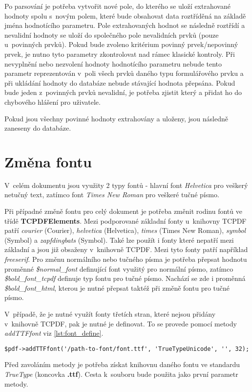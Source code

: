 Po parsování je potřeba vytvořit nové pole, do kterého se uloží extrahované hodnoty spolu s~novým polem, které bude obsahovat data roztříděná na základě jména hodnotícího parametru. Pole extrahovaných hodnot se následně roztřídí a nevalidní hodnoty se uloží do společného pole nevalidních prvků (pouze u~povinných prvků). Pokud bude zvoleno kritérium povinný prvek/nepovinný prvek, je nutno tyto parametry zkontrolovat nad rámec klasické kontroly. Při nevyplnění nebo nezvolení hodnoty hodnotícího parametru nebude tento parametr reprezentován v~poli všech prvků daného typu formulářového prvku a při ukládání hodnoty do databáze nebude stávající hodnota přepsána. Pokud bude jeden z~povinných prvků nevalidní, je potřeba zjistit který a přidat ho do chybového hlášení pro uživatele.
\par
Pokud jsou všechny povinné hodnoty extrahovány a uloženy, jsou následně zaneseny do databáze.

\section{Změna fontu}
V~celém dokumentu jsou využity 2 typy fontů - hlavní font \textit{Helvetica} pro veškerý netučný text, zatímco font \textit{Times New Roman} pro veškeré tučné písmo.
\par
Při případné změně fontu pro celý dokument je potřeba změnit rodinu fontů ve třídě \textbf{TCPDFElements}. Mezi podporované základní fonty u~knihovny TCPDF patří \textit{courier} (Courier), \textit{helvetica} (Helvetica), \textit{times} (Times New Roman), \textit{symbol} (Symbol) a \textit{zapfdingbats} (Symbol). Také lze použít i fonty které nepatří mezi základní a jsou již obsaženy v~knihovně TCPDF. Mezi tyto fonty patří například \textit{freeserif}. Pro změnu normálního nebo tučného písma je potřeba přepsat hodnotu proměnné \textit{\$normal\_font} definující font využitý pro normální písmo, zatímco \textit{\$bold\_font\_tcpdf} definuje typ fontu pro tučné písmo. Nachází se zde i proměnná \textit{\$bold\_font\_html}, kterou je nutné přepsat taktéž při změně fontu pro tučné písmo.
\par
V~případě, že je nutné využít fonty třetích stran, které nejsou přidány v~knihovně TCPDF, pak je nutné je definovat. To se provede pomocí metody \textit{addTTFfont} viz  \ref{lst:font_define}.
\begin{lstlisting}[caption = {Nový font vložený do knihovny TCPDF}, label = {lst:font_define}, captionpos=b]
$pdf->addTTFfont('/path-to-font/font.ttf', 'TrueTypeUnicode', '', 32);
\end{lstlisting}
Před zavoláním metody je potřeba získat knihovnu daného fontu ve standardu \textit{TrueType} (koncovka \textbf{.ttf}). Cesta k~souboru bude použita jako první parametr metody.

